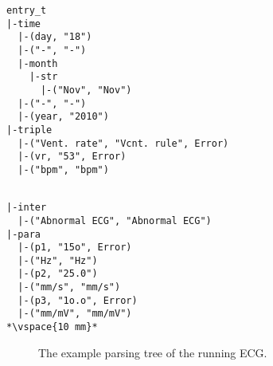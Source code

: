 




\newsavebox{\prflisting}
\begin{lrbox}{\prflisting}%
\begin{lstlisting}
entry_t
|-time
  |-(day, "18")
  |-("-", "-")
  |-month
    |-str
      |-("Nov", "Nov")
  |-("-", "-")
  |-(year, "2010")
|-triple
  |-("Vent. rate", "Vcnt. rule", Error)
  |-(vr, "53", Error)
  |-("bpm", "bpm")
\end{lstlisting}
\end{lrbox}

\newsavebox{\prslisting}
\begin{lrbox}{\prslisting}%
\begin{lstlisting}

|-inter
  |-("Abnormal ECG", "Abnormal ECG")
|-para
  |-(p1, "15o", Error)
  |-("Hz", "Hz")
  |-(p2, "25.0")
  |-("mm/s", "mm/s")
  |-(p3, "1o.o", Error)
  |-("mm/mV", "mm/mV")
*\vspace{10 mm}*
\end{lstlisting}
\end{lrbox}

\begin{figure}[ht]
\subfloat{
\scalebox{1}{\usebox{\prflisting}}}
\hspace{7 mm}
\subfloat{
\scalebox{1}{\usebox{\prslisting}}}
\caption{The example parsing tree of the running ECG.}
\label{fig:running-parsing-tree}
\end{figure}

